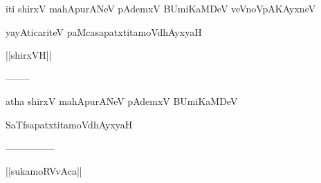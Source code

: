 \documentclass{article}
\begin{document}
\begin{center}
iti shirxV mahApurANeV pAdemxV BUmiKaMDeV veVnoVpAKAyxneV
\end{center}

\begin{center}
yayAticariteV paMcasapatxtitamoVdhAyxyaH
\end{center}

\begin{center}
||shirxVH||
\end{center}

\begin{center}
--------
\end{center}

\begin{center}
atha shirxV mahApurANeV pAdemxV BUmiKaMDeV
\end{center}

\begin{center}
SaTfsapatxtitamoVdhAyxyaH
\end{center}

\begin{center}

---------------
\end{center}

\begin{center}
||sukamoRVvAca||
\end{center}
\end{document}
